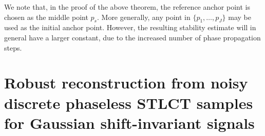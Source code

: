 \documentclass[11pt, reqno]{amsart}
\newcommand{\T}{\mathbb{T}}
\numberwithin{equation}{section}
\begin{document}
%
%    
%	


We note that,  in the proof of the above theorem, the reference anchor point is chosen as the middle point $p_s$. More generally, any point in $\{p_1,\dots,p_J\}$ may be used as the initial anchor point. However, the resulting stability estimate  will in general have a larger constant,  due to the increased number of phase propagation steps.


\medskip 

\section{Robust reconstruction from noisy discrete phaseless STLCT samples for Gaussian shift-invariant signals}\label{robust.sec}
\end{document}
